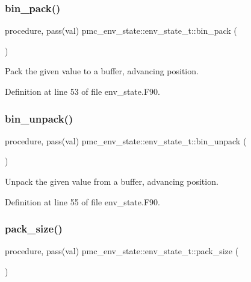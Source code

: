\subsubsection{\texorpdfstring{bin\+\_\+pack()}{bin\_pack()}}
{\footnotesize\ttfamily procedure, pass(val) pmc\+\_\+env\+\_\+state\+::env\+\_\+state\+\_\+t\+::bin\+\_\+pack (\begin{DoxyParamCaption}{ }\end{DoxyParamCaption})}



Pack the given value to a buffer, advancing position. 



Definition at line 53 of file env\+\_\+state.\+F90.

\mbox{\label{structpmc__env__state_1_1env__state__t_aa303dff5aff68191d508bbb757772c2c}} 
\subsubsection{\texorpdfstring{bin\+\_\+unpack()}{bin\_unpack()}}
{\footnotesize\ttfamily procedure, pass(val) pmc\+\_\+env\+\_\+state\+::env\+\_\+state\+\_\+t\+::bin\+\_\+unpack (\begin{DoxyParamCaption}{ }\end{DoxyParamCaption})}



Unpack the given value from a buffer, advancing position. 



Definition at line 55 of file env\+\_\+state.\+F90.

\mbox{\label{structpmc__env__state_1_1env__state__t_a696251e798ed0c73947785d47eb284cd}} 
\subsubsection{\texorpdfstring{pack\+\_\+size()}{pack\_size()}}
{\footnotesize\ttfamily procedure, pass(val) pmc\+\_\+env\+\_\+state\+::env\+\_\+state\+\_\+t\+::pack\+\_\+size (\begin{DoxyParamCaption}{ }\end{DoxyParamCaption})}



